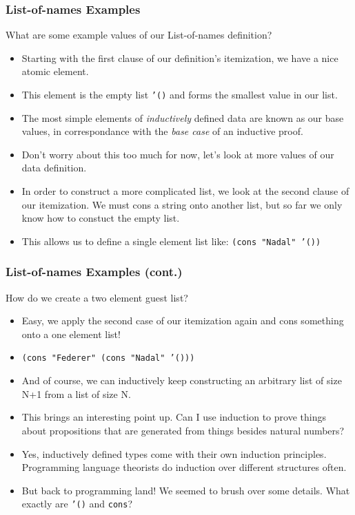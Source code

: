 \documentclass{beamer}
\begin{document}
\begin{frame}
  \frametitle{List-of-names Examples}
  What are some example values of our List-of-names definition?
  \begin{itemize}
  \item<2-> Starting with the first clause of our definition's itemization,
    we have a nice atomic element.
  \item<3-> This element is the empty list \texttt{'()} and forms the smallest  value in our list.
  \item<4-> The most simple elements of \emph{inductively} defined data are known
    as our base values, in correspondance with the \emph{base case} of an
    inductive proof.
  \item<5-> Don't worry about this too much for now, let's look
    at more values of our data definition.
  \item<6-> In order to construct a more complicated list, we look at the second clause of our itemization. We must cons a string
    onto another list, but so far we only know how to constuct the empty list.
  \item<7-> This allows us to define a single element list like:
    \texttt{(cons "Nadal" '())}
  \end{itemize}
\end{frame}

\begin{frame}
  \frametitle{List-of-names Examples (cont.)}
  How do we create a two element guest list?
  \begin{itemize}
  \item<2-> Easy, we apply the second case of our itemization again and cons something onto a one element list!
  \item<3-> \texttt{(cons "Federer" (cons "Nadal" '()))}
  \item<4-> And of course, we can inductively keep constructing an arbitrary
    list of size N+1 from a list of size N.
  \item<5-> This brings an interesting point up. Can I use induction to prove
    things about propositions that are generated from things besides natural numbers?
  \item<6-> Yes, inductively defined types come with their own induction principles. Programming language theorists do induction over different structures often.
  \item<7-> But back to programming land! We seemed to brush over some details.
    What exactly are \texttt{'()} and \texttt{cons}?
  \end{itemize}
\end{frame}
\end{document}
